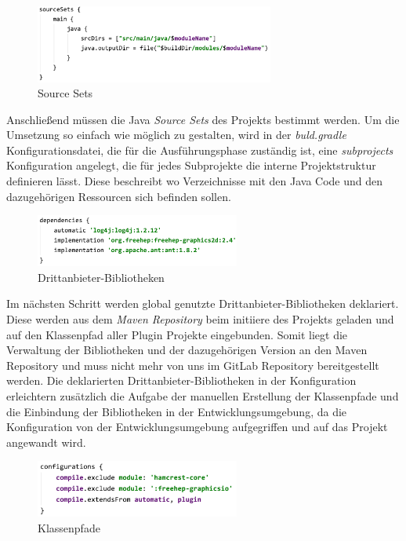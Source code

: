 	\begin{figure}[h!]
	  \centering
	  \includegraphics[width=0.7\textwidth]{material/images/sourceSets.png}
	  \caption{Source Sets}
	  \label{fig:Source_Sets}
	\end{figure}

 	Anschließend müssen die Java \textit{Source Sets} des Projekts bestimmt werden. Um die Umsetzung so einfach wie möglich zu gestalten, wird in der \textit{buld.gradle} Konfigurationsdatei, die für die Ausführungsphase zuständig ist, eine \textit{subprojects} Konfiguration angelegt, die für jedes Subprojekte die interne Projektstruktur definieren lässt. Diese beschreibt wo Verzeichnisse mit den Java Code und den dazugehörigen Ressourcen sich befinden sollen.  
	\bigbreak

	\begin{figure}[h!]
	  \centering
	  \includegraphics[width=0.6\textwidth]{material/images/dep_global.png}
	  \caption{Drittanbieter-Bibliotheken}
	  \label{fig:deps}
	\end{figure}

 	Im nächsten Schritt werden global genutzte Drittanbieter-Bibliotheken deklariert. Diese werden aus dem \textit{Maven Repository} beim initiiere des Projekts geladen und auf den Klassenpfad aller Plugin Projekte eingebunden. Somit liegt die Verwaltung der Bibliotheken und der dazugehörigen Version an den Maven Repository und muss nicht mehr von uns im GitLab Repository bereitgestellt werden. Die deklarierten Drittanbieter-Bibliotheken in der Konfiguration erleichtern zusätzlich die Aufgabe der manuellen Erstellung der Klassenpfade und die Einbindung der Bibliotheken in der Entwicklungsumgebung, da die Konfiguration von der Entwicklungsumgebung aufgegriffen und auf das Projekt angewandt wird. 
	\newpage

	\begin{figure}[h!]
	  \centering
	  \includegraphics[width=0.6\textwidth]{material/images/configurations.png}
	  \caption{Klassenpfade}
	  \label{fig:kPath}
	\end{figure}

